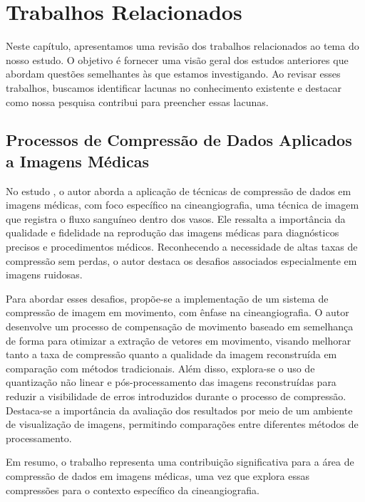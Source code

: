 \chapter{Trabalhos Relacionados}
\label{cap:relac}

Neste capítulo, apresentamos uma revisão dos trabalhos relacionados ao tema do nosso estudo. O objetivo é fornecer uma visão geral dos estudos anteriores que abordam questões semelhantes às que estamos investigando. Ao revisar esses trabalhos, buscamos identificar lacunas no conhecimento existente e destacar como nossa pesquisa contribui para preencher essas lacunas.

\section{Processos de Compressão de Dados Aplicados a Imagens Médicas} 
No estudo , o autor aborda a aplicação de técnicas de compressão de dados em imagens médicas, com foco específico na cineangiografia, uma técnica de imagem que registra o fluxo sanguíneo dentro dos vasos. Ele ressalta a importância da qualidade e fidelidade na reprodução das imagens médicas para diagnósticos precisos e procedimentos médicos. Reconhecendo a necessidade de altas taxas de compressão sem perdas, o autor destaca os desafios associados especialmente em imagens ruidosas.

Para abordar esses desafios, propõe-se a implementação de um sistema de compressão de imagem em movimento, com ênfase na cineangiografia. O autor desenvolve um processo de compensação de movimento baseado em semelhança de forma para otimizar a extração de vetores em movimento, visando melhorar tanto a taxa de compressão quanto a qualidade da imagem reconstruída em comparação com métodos tradicionais. Além disso, explora-se o uso de quantização não linear e pós-processamento das imagens reconstruídas para reduzir a visibilidade de erros introduzidos durante o processo de compressão. Destaca-se a importância da avaliação dos resultados por meio de um ambiente de visualização de imagens, permitindo comparações entre diferentes métodos de processamento.

Em resumo, o trabalho representa uma contribuição significativa para a área de compressão de dados em imagens médicas, uma vez que explora essas compressões para o contexto específico  da cineangiografia. 

